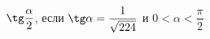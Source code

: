 \begin{ex}[type=simplify_calculate]
	\begin{condition}
		\( \tg\dfrac{\alpha}{2} \), \quad если \( \tg\alpha=\dfrac{1}{\sqrt{224}} \) и \( 0<\alpha<\dfrac{\pi}{2} \)
	\end{condition}
\end{ex}